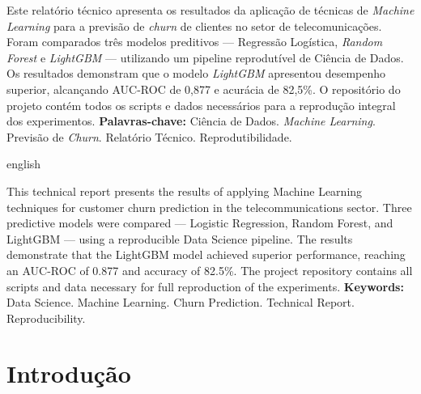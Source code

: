 \documentclass[
    article,
    12pt,
    oneside,
    a4paper,
    english,
    brazilian
    ]{abntex2}
\numberwithin{equation}{section}
\begin{document}
\pretextual
\maketitle
\newpage

\begin{resumo}
\noindent Este relatório técnico apresenta os resultados da aplicação de técnicas de \textit{Machine Learning} para a previsão de \textit{churn} de clientes no setor de telecomunicações. Foram comparados três modelos preditivos --- Regressão Logística, \textit{Random Forest} e \textit{LightGBM} --- utilizando um pipeline reprodutível de Ciência de Dados. Os resultados demonstram que o modelo \textit{LightGBM} apresentou desempenho superior, alcançando AUC-ROC de 0,877 e acurácia de 82,5\%. O repositório do projeto contém todos os scripts e dados necessários para a reprodução integral dos experimentos.
\newline
\noindent \textbf{Palavras-chave:} Ciência de Dados. \textit{Machine Learning}. Previsão de \textit{Churn}. Relatório Técnico. Reprodutibilidade.
\end{resumo}

\begin{otherlanguage*}{english}
\begin{resumo}[Abstract]
\noindent This technical report presents the results of applying Machine Learning techniques for customer churn prediction in the telecommunications sector. Three predictive models were compared --- Logistic Regression, Random Forest, and LightGBM --- using a reproducible Data Science pipeline. The results demonstrate that the LightGBM model achieved superior performance, reaching an AUC-ROC of 0.877 and accuracy of 82.5\%. The project repository contains all scripts and data necessary for full reproduction of the experiments.
\newline
\noindent \textbf{Keywords:} Data Science. Machine Learning. Churn Prediction. Technical Report. Reproducibility.
\end{resumo}
\end{otherlanguage*}
\newpage

\textual

\section{Introdução}
\end{document}
